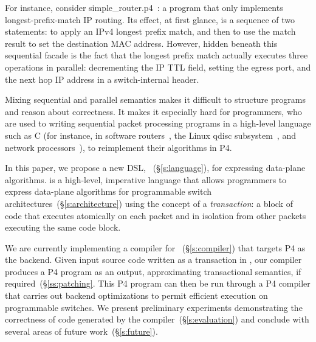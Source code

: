 For instance, consider simple\_router.p4~\cite{simple_router.p4}: a program
that only implements longest-prefix-match IP routing. Its effect, at first glance,
is a sequence of two statements: to apply an IPv4 longest prefix match, and
then to use the match result  to set the destination MAC address. However,
hidden beneath this sequential facade is the fact that the longest prefix match
actually executes three operations in parallel: decrementing the IP TTL field,
setting the egress port, and the next hop IP address in a switch-internal
header.

Mixing sequential and parallel semantics makes it difficult to structure
programs and reason about correctness. It makes it especially hard for
programmers, who are used to writing sequential packet processing programs in a
high-level language such as C (for instance, in software routers~\cite{click,
intel_multicore}, the Linux qdisc subsystem~\cite{qdisc}, and network
processors~\cite{npu}), to reimplement their algorithms in P4.

In this paper, we propose a new DSL, \pktlanguage~(\S\ref{s:language}), for
expressing data-plane algorithms. \pktlanguage is a high-level, imperative
language that allows programmers to express data-plane algorithms for
programmable switch architectures~(\S\ref{s:architecture}) using the concept of
a {\em transaction}: a block of code that executes atomically on each packet
and in isolation from other packets executing the same code block.

We are currently implementing a compiler for \pktlanguage~(\S\ref{s:compiler})
that targets P4 as the backend. Given input source code written as a
transaction in \pktlanguage, our compiler produces a P4 program as an output,
approximating transactional semantics, if required~(\S\ref{ss:patching}.  This
P4 program can then be run through a P4 compiler that carries out backend
optimizations to permit efficient execution on programmable switches.  We
present preliminary experiments demonstrating the correctness of code generated
by the compiler~(\S\ref{s:evaluation}) and conclude with several areas of
future work~(\S\ref{s:future}).
